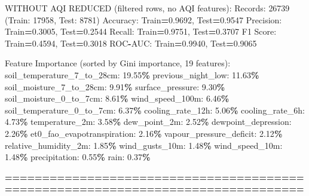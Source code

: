 \documentclass[
  letterpaper,
  DIV=11,
  numbers=noendperiod]{scrartcl}
\newenvironment{Shaded}{\begin{snugshade}}{\end{snugshade}}
\newcommand{\BuiltInTok}[1]{#1}
\newcommand{\DecValTok}[1]{\textcolor[rgb]{0.00,0.00,0.81}{#1}}
\newcommand{\FloatTok}[1]{\textcolor[rgb]{0.00,0.00,0.81}{#1}}
\newcommand{\NormalTok}[1]{#1}
\newcommand{\OperatorTok}[1]{\textcolor[rgb]{0.81,0.36,0.00}{\textbf{#1}}}
\begin{document}
\begin{Shaded}
\begin{Highlighting}[]
\NormalTok{WITHOUT AQI REDUCED (filtered rows, no AQI features):}
\NormalTok{  Records: }\DecValTok{26739}\NormalTok{ (Train: }\DecValTok{17958}\NormalTok{, Test: }\DecValTok{8781}\NormalTok{)}
\NormalTok{  Accuracy: Train}\OperatorTok{=}\FloatTok{0.9692}\NormalTok{, Test}\OperatorTok{=}\FloatTok{0.9547}
\NormalTok{  Precision: Train}\OperatorTok{=}\FloatTok{0.3005}\NormalTok{, Test}\OperatorTok{=}\FloatTok{0.2544}
\NormalTok{  Recall: Train}\OperatorTok{=}\FloatTok{0.9751}\NormalTok{, Test}\OperatorTok{=}\FloatTok{0.3707}
\NormalTok{  F1 Score: Train}\OperatorTok{=}\FloatTok{0.4594}\NormalTok{, Test}\OperatorTok{=}\FloatTok{0.3018}
\NormalTok{  ROC}\OperatorTok{{-}}\NormalTok{AUC: Train}\OperatorTok{=}\FloatTok{0.9940}\NormalTok{, Test}\OperatorTok{=}\FloatTok{0.9065}

\NormalTok{  Feature Importance (}\BuiltInTok{sorted}\NormalTok{ by Gini importance, }\DecValTok{19}\NormalTok{ features):}
\NormalTok{    soil\_temperature\_7\_to\_28cm: }\FloatTok{19.55}\OperatorTok{\%}
\NormalTok{    previous\_night\_low: }\FloatTok{11.63}\OperatorTok{\%}
\NormalTok{    soil\_moisture\_7\_to\_28cm: }\FloatTok{9.91}\OperatorTok{\%}
\NormalTok{    surface\_pressure: }\FloatTok{9.30}\OperatorTok{\%}
\NormalTok{    soil\_moisture\_0\_to\_7cm: }\FloatTok{8.61}\OperatorTok{\%}
\NormalTok{    wind\_speed\_100m: }\FloatTok{6.46}\OperatorTok{\%}
\NormalTok{    soil\_temperature\_0\_to\_7cm: }\FloatTok{6.37}\OperatorTok{\%}
\NormalTok{    cooling\_rate\_12h: }\FloatTok{5.06}\OperatorTok{\%}
\NormalTok{    cooling\_rate\_6h: }\FloatTok{4.73}\OperatorTok{\%}
\NormalTok{    temperature\_2m: }\FloatTok{3.58}\OperatorTok{\%}
\NormalTok{    dew\_point\_2m: }\FloatTok{2.52}\OperatorTok{\%}
\NormalTok{    dewpoint\_depression: }\FloatTok{2.26}\OperatorTok{\%}
\NormalTok{    et0\_fao\_evapotranspiration: }\FloatTok{2.16}\OperatorTok{\%}
\NormalTok{    vapour\_pressure\_deficit: }\FloatTok{2.12}\OperatorTok{\%}
\NormalTok{    relative\_humidity\_2m: }\FloatTok{1.85}\OperatorTok{\%}
\NormalTok{    wind\_gusts\_10m: }\FloatTok{1.48}\OperatorTok{\%}
\NormalTok{    wind\_speed\_10m: }\FloatTok{1.48}\OperatorTok{\%}
\NormalTok{    precipitation: }\FloatTok{0.55}\OperatorTok{\%}
\NormalTok{    rain: }\FloatTok{0.37}\OperatorTok{\%}

\OperatorTok{================================================================================}


\end{Highlighting}
\end{Shaded}
\end{document}
